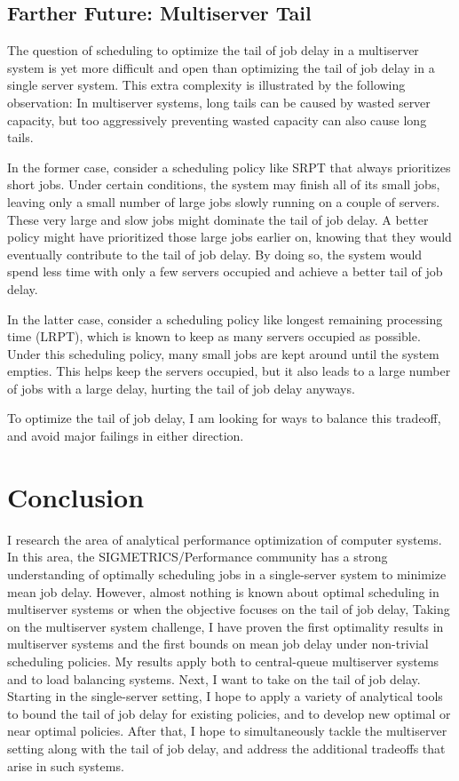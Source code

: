\documentclass[11pt]{article}
\begin{document}
\subsection{Farther Future: Multiserver Tail}
The question of scheduling to optimize the tail of job delay in a multiserver system
is yet more difficult and open than optimizing the tail of job delay in a single server system.
This extra complexity is illustrated by the following observation:
In multiserver systems, long tails can be caused by wasted server capacity,
but too aggressively preventing wasted capacity can also cause long tails.

In the former case, consider a scheduling policy like SRPT
that always prioritizes short jobs.
Under certain conditions, the system may finish all of its small jobs,
leaving only a small number of large jobs slowly running on a couple of servers.
These very large and slow jobs might dominate the tail of job delay.
A better policy might have prioritized those large jobs earlier on,
knowing that they would eventually contribute to the tail of job delay.
By doing so, the system would spend less time with only a few servers occupied
and achieve a better tail of job delay.

In the latter case, consider a scheduling policy like longest remaining processing time (LRPT),
which is known to keep as many servers occupied as possible.
Under this scheduling policy, many small jobs are kept around until the system empties.
This helps keep the servers occupied,
but it also leads to a large number of jobs with a large delay,
hurting the tail of job delay anyways.

To optimize the tail of job delay, I am looking for ways to balance this tradeoff, and avoid major failings in either direction.
\section{Conclusion}
I research the area of analytical performance optimization of computer systems.
In this area, the SIGMETRICS/Performance community has a strong understanding
of optimally scheduling jobs in a single-server system to minimize mean job delay.
However, almost nothing is known about optimal scheduling in multiserver systems
or when the objective focuses on the tail of job delay,
Taking on the multiserver system challenge,
I have proven
the first optimality results in multiserver systems
and
the first bounds on mean job delay under non-trivial scheduling policies.
My results apply both to central-queue multiserver systems
and to load balancing systems.
Next, I want to take on the tail of job delay.
Starting in the single-server setting,
I hope to apply a variety of analytical tools to bound the tail of job delay for existing policies,
and to develop new optimal or near optimal policies.
After that, I hope to simultaneously tackle the multiserver setting along with
the tail of job delay,
and address the additional tradeoffs that arise in such systems.

\footnotesize


\end{document}
